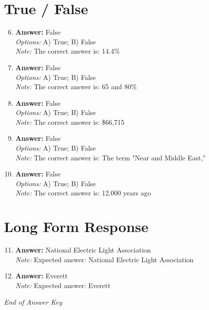 \documentclass[12pt]{article}
\begin{document}
\section*{True / False}
\begin{enumerate}[label=\arabic*.]
\setcounter{enumi}{5}
\item \textbf{Answer:} False
\\ \textit{Options:} A) True; B) False
\\ \textit{Note:} The correct answer is: 14.4\%
\item \textbf{Answer:} False
\\ \textit{Options:} A) True; B) False
\\ \textit{Note:} The correct answer is: 65 and 80\%
\item \textbf{Answer:} False
\\ \textit{Options:} A) True; B) False
\\ \textit{Note:} The correct answer is: \$66,715
\item \textbf{Answer:} False
\\ \textit{Options:} A) True; B) False
\\ \textit{Note:} The correct answer is: The term "Near and Middle East,"
\item \textbf{Answer:} False
\\ \textit{Options:} A) True; B) False
\\ \textit{Note:} The correct answer is: 12,000 years ago
\end{enumerate}

\section*{Long Form Response}
\begin{enumerate}[label=\arabic*.]
\setcounter{enumi}{10}
\item \textbf{Answer:} National Electric Light Association
\\ \textit{Note:} Expected answer: National Electric Light Association
\item \textbf{Answer:} Everett
\\ \textit{Note:} Expected answer: Everett
\end{enumerate}

\vfill
\noindent\textit{End of Answer Key}
\end{document}
